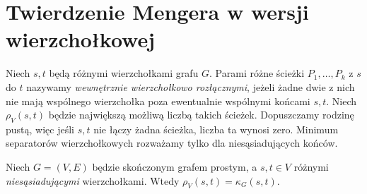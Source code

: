 \section{Twierdzenie Mengera w wersji wierzchołkowej}
\label{sec:tg-menger-vertices}

\begin{definicja}
Niech $s,t$ będą różnymi wierzchołkami grafu $G$.
Parami różne ścieżki $P_1,\dots,P_k$ z $s$ do $t$ nazywamy
\emph{wewnętrznie wierzchołkowo rozłącznymi}, jeżeli
żadne dwie z nich nie mają wspólnego wierzchołka
poza ewentualnie wspólnymi końcami $s,t$.
Niech $\rho_V(s,t)$ będzie największą możliwą
liczbą takich ścieżek. Dopuszczamy rodzinę pustą,
więc jeśli $s,t$ nie łączy żadna ścieżka, liczba ta
wynosi zero. Minimum separatorów wierzchołkowych
rozważamy tylko dla niesąsiadujących końców.
\end{definicja}

\begin{twierdzenie}
\label{thm:tg-menger-vertex}
Niech $G=(V,E)$ będzie skończonym grafem prostym,
a $s,t\in V$ różnymi \emph{niesąsiadującymi} wierzchołkami.
Wtedy $\rho_V(s,t)=\kappa_G(s,t)$.
\end{twierdzenie}


